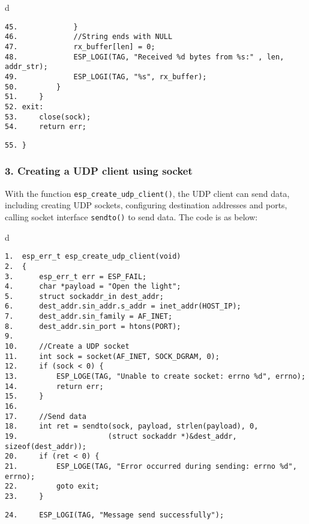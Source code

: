 \documentclass[a4paper,12pt]{book}
\begin{document}
\begin{codebloc}
\begin{tabular}{d}
\vspace{2pt}
\begin{verbatim}
45.             }
46.             //String ends with NULL
47.             rx_buffer[len] = 0;
48.             ESP_LOGI(TAG, "Received %d bytes from %s:" , len, addr_str);
49.             ESP_LOGI(TAG, "%s", rx_buffer);
50.         }
51.     }
52. exit:
53.     close(sock);
54.     return err;
\end{verbatim}
\verb|55. }|
\end{tabular}
\end{codebloc}

\subsubsection{3. Creating a UDP client using socket}

With the function \verb|esp_create_udp_client()|, the UDP client can send data, including creating UDP sockets, configuring destination addresses and ports, calling socket interface \verb|sendto()| to send data. The code is as below:

\begin{codebloc}
\begin{tabular}{d}
\vspace{2pt}
\begin{verbatim}
1.  esp_err_t esp_create_udp_client(void)
2.  {
3.      esp_err_t err = ESP_FAIL;
4.      char *payload = "Open the light";
5.      struct sockaddr_in dest_addr;
6.      dest_addr.sin_addr.s_addr = inet_addr(HOST_IP);
7.      dest_addr.sin_family = AF_INET;
8.      dest_addr.sin_port = htons(PORT);
9.	
10.     //Create a UDP socket
11.     int sock = socket(AF_INET, SOCK_DGRAM, 0);
12.     if (sock < 0) {
13.         ESP_LOGE(TAG, "Unable to create socket: errno %d", errno);
14.         return err;
15.     }
16. 	 
17.     //Send data
18.     int ret = sendto(sock, payload, strlen(payload), 0,
19.                     (struct sockaddr *)&dest_addr, sizeof(dest_addr));
20.     if (ret < 0) {
21.         ESP_LOGE(TAG, "Error occurred during sending: errno %d", errno);
22.         goto exit;
23.     }
\end{verbatim}
\verb|24.     ESP_LOGI(TAG, "Message send successfully");|
\end{tabular}
\end{codebloc}
\end{document}
